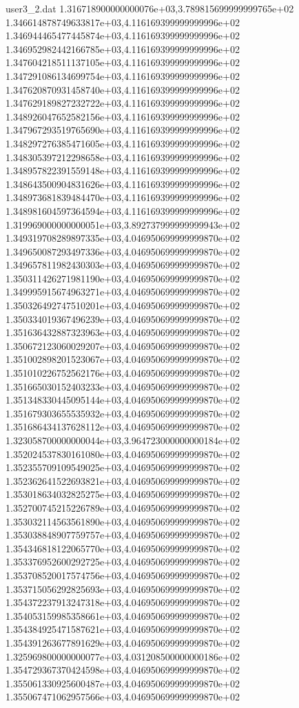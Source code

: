 \begin{filecontents}{user3_2.dat}
1.316718900000000076e+03,3.789815699999999765e+02
1.346614878749633817e+03,4.116169399999999996e+02
1.346944465477445874e+03,4.116169399999999996e+02
1.346952982442166785e+03,4.116169399999999996e+02
1.347604218511137105e+03,4.116169399999999996e+02
1.347291086134699754e+03,4.116169399999999996e+02
1.347620870931458740e+03,4.116169399999999996e+02
1.347629189827232722e+03,4.116169399999999996e+02
1.348926047652582156e+03,4.116169399999999996e+02
1.347967293519765690e+03,4.116169399999999996e+02
1.348297276385471605e+03,4.116169399999999996e+02
1.348305397212298658e+03,4.116169399999999996e+02
1.348957822391559148e+03,4.116169399999999996e+02
1.348643500904831626e+03,4.116169399999999996e+02
1.348973681839484470e+03,4.116169399999999996e+02
1.348981604597364594e+03,4.116169399999999996e+02
1.319969000000000051e+03,3.892737999999999943e+02
1.349319708289897335e+03,4.046950699999999870e+02
1.349650087293497336e+03,4.046950699999999870e+02
1.349657811982430303e+03,4.046950699999999870e+02
1.350311426271981190e+03,4.046950699999999870e+02
1.349995915674963271e+03,4.046950699999999870e+02
1.350326492747510201e+03,4.046950699999999870e+02
1.350334019367496239e+03,4.046950699999999870e+02
1.351636432887323963e+03,4.046950699999999870e+02
1.350672123060029207e+03,4.046950699999999870e+02
1.351002898201523067e+03,4.046950699999999870e+02
1.351010226752562176e+03,4.046950699999999870e+02
1.351665030152403233e+03,4.046950699999999870e+02
1.351348330445095144e+03,4.046950699999999870e+02
1.351679303655535932e+03,4.046950699999999870e+02
1.351686434137628112e+03,4.046950699999999870e+02
1.323058700000000044e+03,3.964723000000000184e+02
1.352024537830161080e+03,4.046950699999999870e+02
1.352355709109549025e+03,4.046950699999999870e+02
1.352362641522693821e+03,4.046950699999999870e+02
1.353018634032825275e+03,4.046950699999999870e+02
1.352700745215226789e+03,4.046950699999999870e+02
1.353032114563561890e+03,4.046950699999999870e+02
1.353038848907759757e+03,4.046950699999999870e+02
1.354346818122065770e+03,4.046950699999999870e+02
1.353376952600292725e+03,4.046950699999999870e+02
1.353708520017574756e+03,4.046950699999999870e+02
1.353715056292825693e+03,4.046950699999999870e+02
1.354372237913247318e+03,4.046950699999999870e+02
1.354053159985358661e+03,4.046950699999999870e+02
1.354384925471587621e+03,4.046950699999999870e+02
1.354391263677891629e+03,4.046950699999999870e+02
1.325969800000000077e+03,4.031208500000000186e+02
1.354729367370424598e+03,4.046950699999999870e+02
1.355061330925600487e+03,4.046950699999999870e+02
1.355067471062957566e+03,4.046950699999999870e+02

\end{filecontents}
